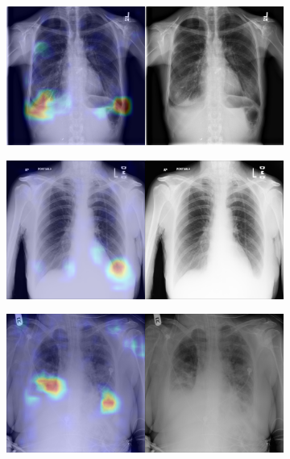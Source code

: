 \begin{figure}[b]
    \centering
    \begin{subfigure}{0.4\textwidth}
        \centering
        \includegraphics[width=1.0\textwidth]{Chapters/5. Conclusiones/img/Effusion/1_1_00000092_001.png}
    \end{subfigure}
    \begin{subfigure}{0.4\textwidth}
        \centering
        \includegraphics[width=1.0\textwidth]{Chapters/5. Conclusiones/img/Effusion/1_1_00000147_002.png}
    \end{subfigure}
    \begin{subfigure}{0.4\textwidth}
        \centering
        \includegraphics[width=1.0\textwidth]{Chapters/5. Conclusiones/img/Effusion/1_1_00000181_005.png}

\end{subfigure}
\end{figure}

